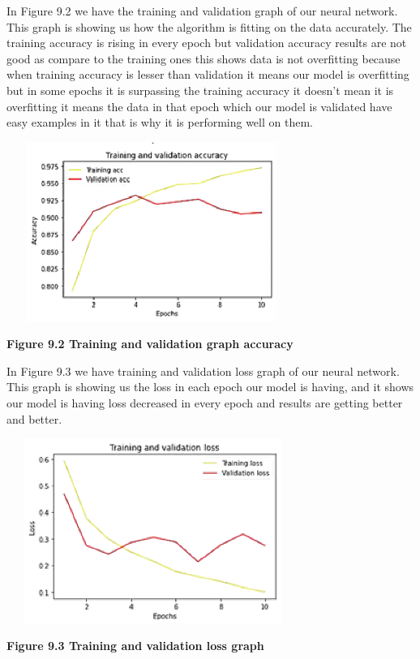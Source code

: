 \documentclass{article} %
\begin{document}
\noindent In Figure 9.2 we have the training and validation graph of our neural network. This graph is showing us how the algorithm is fitting on the data accurately. The training accuracy is rising in every epoch but validation accuracy results are not good as compare to the training ones this shows data is not overfitting because when training accuracy is lesser than validation it means our model is overfitting but in some epochs it is surpassing the training accuracy it doesn't mean it is overfitting it means the data in that epoch which our model is validated have easy examples in it that is why it is performing well on them.

\noindent \includegraphics*[width=3.73in, height=2.30in, keepaspectratio=false, trim=0.00in 0.13in 0.00in 0.25in]{image43}

\noindent \textbf{Figure 9.2 Training and validation graph accuracy}

\noindent In Figure 9.3 we have training and validation loss graph of our neural network. This graph is showing us the loss in each epoch our model is having, and it shows our model is having loss decreased in every epoch and results are getting better and better.

\noindent \includegraphics*[width=3.76in, height=2.37in, keepaspectratio=false, trim=0.00in 0.00in 0.00in 0.20in]{image44}

\noindent \textbf{Figure 9.3 Training and validation loss graph}
\end{document}
